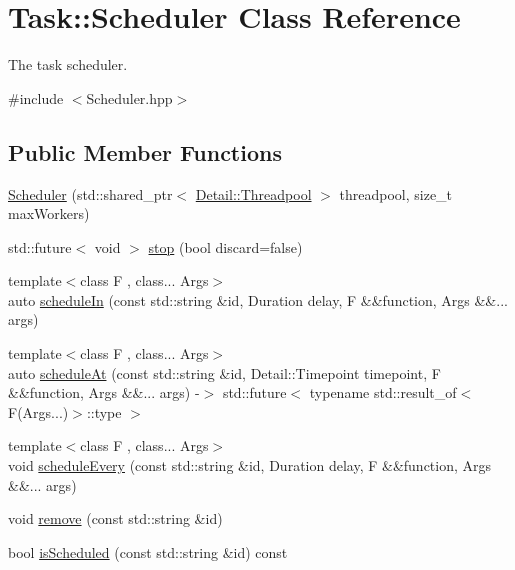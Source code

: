 \hypertarget{classTask_1_1Scheduler}{}\section{Task\+:\+:Scheduler Class Reference}
\label{classTask_1_1Scheduler}


The task scheduler.  




{\ttfamily \#include $<$Scheduler.\+hpp$>$}

\subsection*{Public Member Functions}
\begin{DoxyCompactItemize}
\item 
\hyperlink{classTask_1_1Scheduler_a5ea9aca03803b6d0ee786841b8e49759}{Scheduler} (std\+::shared\+\_\+ptr$<$ \hyperlink{classTask_1_1Detail_1_1Threadpool}{Detail\+::\+Threadpool} $>$ threadpool, size\+\_\+t max\+Workers)
\item 
std\+::future$<$ void $>$ \hyperlink{classTask_1_1Scheduler_ae8b5e676c81dc9ed81e5ff0e03830d5f}{stop} (bool discard=false)
\item 
{\footnotesize template$<$class F , class... Args$>$ }\\auto \hyperlink{classTask_1_1Scheduler_a18f292492bf81fe40dc0b2c738c675f8}{schedule\+In} (const std\+::string \&id, Duration delay, F \&\&function, Args \&\&... args)
\item 
{\footnotesize template$<$class F , class... Args$>$ }\\auto \hyperlink{classTask_1_1Scheduler_a02811a81c637db4cf27261c58e1a7060}{schedule\+At} (const std\+::string \&id, Detail\+::\+Timepoint timepoint, F \&\&function, Args \&\&... args) -\/$>$ std\+::future$<$ typename std\+::result\+\_\+of$<$ F(Args...)$>$\+::type $>$
\item 
{\footnotesize template$<$class F , class... Args$>$ }\\void \hyperlink{classTask_1_1Scheduler_a00149af09fa04110105ba575bc7e88fe}{schedule\+Every} (const std\+::string \&id, Duration delay, F \&\&function, Args \&\&... args)
\item 
void \hyperlink{classTask_1_1Scheduler_a054abc32dfe84571e2591cee11de2ab1}{remove} (const std\+::string \&id)
\item 
bool \hyperlink{classTask_1_1Scheduler_a50bb4dbf7d2d232d6ebc6a109166e4ab}{is\+Scheduled} (const std\+::string \&id) const
\end{DoxyCompactItemize}



